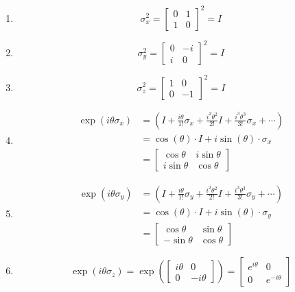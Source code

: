 \documentclass{article}
\begin{document}
\bigskip
\begin{prob}
\end{prob}
\begin{enumerate}[label=(\alph*)]
    \item
        \[ \sigma_x^2 = \begin{bmatrix}
            0 & 1 \\
            1 & 0
        \end{bmatrix}^2 = I \]
    \item
        \[ \sigma_y^2 = \begin{bmatrix}
            0 & -i \\
            i & 0
        \end{bmatrix}^2 = I \]
    \item
        \[ \sigma_z^2 = \begin{bmatrix}
            1 & 0 \\
            0 & -1
        \end{bmatrix}^2 = I \]
    \item
        \begin{align*}
            \exp(i\theta \sigma_x) &= \left( I + \frac{i\theta}{1!} \sigma_x + \frac{i^2\theta^2}{2!} I + \frac{i^3\theta^3}{3!} \sigma_x + \cdots \right) \\
                                   &= \cos(\theta) \cdot I + i \sin(\theta) \cdot \sigma_x \\
                                   &= \begin{bmatrix}
                                       \cos \theta & i \sin \theta \\
                                       i \sin \theta & \cos \theta
                                   \end{bmatrix}
        \end{align*}
    \item
        \begin{align*}
            \exp(i\theta \sigma_y) &= \left( I + \frac{i\theta}{1!} \sigma_y + \frac{i^2\theta^2}{2!} I + \frac{i^3\theta^3}{3!} \sigma_y + \cdots \right) \\
                                   &= \cos(\theta) \cdot I + i \sin(\theta) \cdot \sigma_y \\
                                   &= \begin{bmatrix}
                                       \cos \theta & \sin \theta \\
                                       - \sin \theta & \cos \theta
                                   \end{bmatrix}
        \end{align*}
    \item
        \[ \exp(i \theta \sigma_z) = \exp \left( \begin{bmatrix}
                i \theta & 0 \\
                0 & -i \theta
        \end{bmatrix} \right) = \begin{bmatrix}
                e^{i\theta} & 0 \\
                0 & e^{-i\theta}
        \end{bmatrix} \]
        

\end{enumerate}
\end{document}

